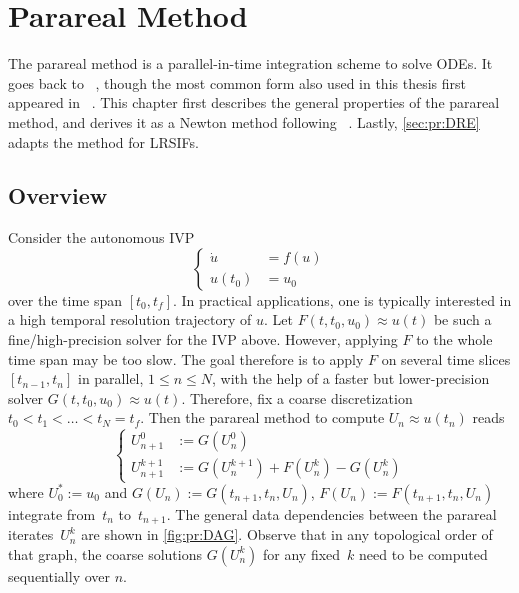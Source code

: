\chapter{Parareal Method}
\label{sec:pr}

The parareal method is a parallel-in-time integration scheme to solve \acp{ODE}.
It goes back to \citeauthor{Lions2001}~\cite{Lions2001},
though the most common form also used in this thesis first appeared in \citeauthor{Baffico2002}~\cite{Baffico2002}.
This chapter first describes the general properties of the parareal method,
and derives it as a Newton method following \citeauthor{Gander2007}~\cite{Gander2007}.
Lastly, \autoref{sec:pr:DRE} adapts the method for \acp{LRSIF}.

\section{Overview}
\label{sec:pr:properties}

Consider the autonomous \ac{IVP}
\begin{equation}
  \label{eq:IVP}
  \left\{
  \begin{aligned}
    \dot u &= f(u) \\
    u(t_0) &= u_0
  \end{aligned}
  \right.
\end{equation}
over the time span $[t_0, t_f]$.
In practical applications,
one is typically interested in a high temporal resolution trajectory of $u$.
Let $F(t, t_0, u_0) \approx u(t)$ be such a fine/high-precision solver for the \ac{IVP} above.
However, applying $F$ to the whole time span may be too slow.
The goal therefore is to apply $F$ on several time slices $[t_{n-1}, t_n]$ in parallel,
$1 \leq n \leq N$,
with the help of a faster but lower-precision solver $G(t, t_0, u_0) \approx u(t)$.
Therefore, fix a coarse discretization $t_0 < t_1 < \ldots < t_N = t_f$.
Then the parareal method to compute $U_n \approx u(t_n)$ reads
\begin{equation}
  \label{eq:pr:method}
  \left\{
  \begin{aligned}
    U^0_{n+1} &:= G(U^0_n) \\
    U^{k+1}_{n+1} &:= G(U^{k+1}_n) + F(U^k_n) - G(U^k_n)
  \end{aligned}
  \right.
\end{equation}
where $U^*_0 := u_0$ and $G(U_n) := G(t_{n+1}, t_n, U_n)$,
$F(U_n) := F(t_{n+1}, t_n, U_n)$
integrate from~$t_n$ to~$t_{n+1}$.
The general data dependencies between the parareal iterates~$U_n^k$
are shown in \autoref{fig:pr:DAG}.
Observe that in any topological order of that graph,
the coarse solutions $G(U_n^k)$ for any fixed~$k$ need to be computed sequentially over $n$.

